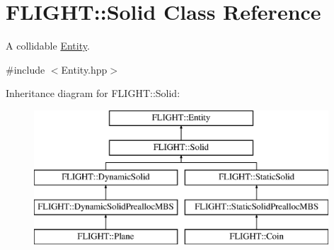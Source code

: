 \hypertarget{class_f_l_i_g_h_t_1_1_solid}{}\section{F\+L\+I\+G\+HT\+:\+:Solid Class Reference}
\label{class_f_l_i_g_h_t_1_1_solid}


A collidable \hyperlink{class_f_l_i_g_h_t_1_1_entity}{Entity}.  




{\ttfamily \#include $<$Entity.\+hpp$>$}

Inheritance diagram for F\+L\+I\+G\+HT\+:\+:Solid\+:\begin{figure}[H]
\begin{center}
\leavevmode
\includegraphics[height=5.000000cm]{class_f_l_i_g_h_t_1_1_solid}
\end{center}
\end{figure}
